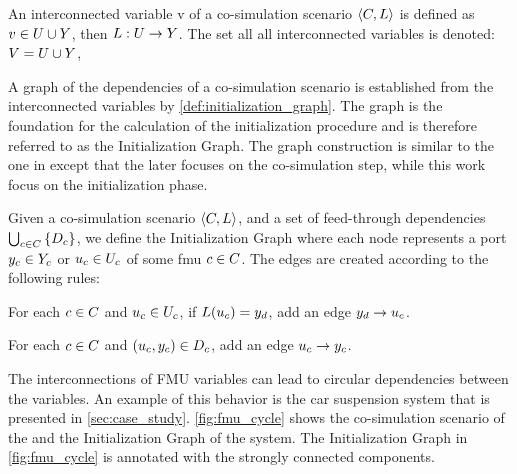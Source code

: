 \begin{definition}
An interconnected variable v of a co-simulation scenario $ \left\langle C, L \right\rangle $ is defined as $v \in U \cup Y$, then $L : U \to Y$.
The set all all interconnected variables is denoted: $V = U \cup Y$,
\end{definition}

A graph of the dependencies of a co-simulation scenario is established from the interconnected variables by \cref{def:initialization_graph}. The graph is the foundation for the calculation of the initialization procedure and is therefore referred to as the Initialization Graph. The graph construction is similar to the one in \cite{Gomes2019c} except that the later focuses on the co-simulation step, while this work focus on the initialization phase.

\begin{definition}\label{def:initialization_graph}
  Given a co-simulation scenario $ \left\langle C, L \right\rangle $, and a set of feed-through dependencies $\bigcup_{c \in C}  \left\{ D_{c} \right\}$, we define the Initialization Graph where each node represents a port $y_{c} \in Y_{c}$ or $u_{c} \in U_{c}$ of some fmu $c \in C$. The edges are created according to the following rules:
  \begin{compactenum}
    \item For each $c \in C$ and $u_{c} \in U_{c}$, if $L(u_{c}) = y_{d}$, add an edge $y_{d} -> u_{c}$.
    \item For each $c \in C$ and $(u_{c},y_{c}) \in D_{c}$, add an edge $u_{c} -> y_{c}$.
  \end{compactenum}
\end{definition}

The interconnections of FMU variables can lead to circular dependencies between the variables. An example of this behavior is the car suspension system that is presented in \cref{sec:case_study}. \cref{fig:fmu_cycle} shows the co-simulation scenario of the and the Initialization Graph of the system. The Initialization Graph in \cref{fig:fmu_cycle} is annotated with the strongly connected components.

